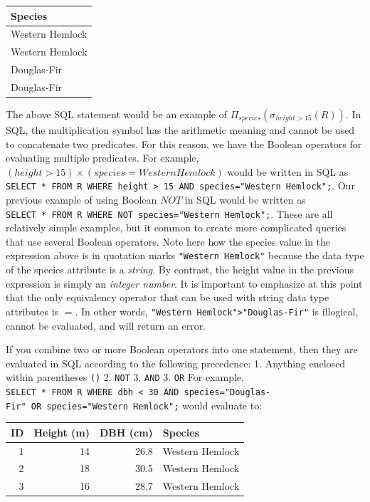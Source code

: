 \documentclass[
]{book}
\begin{document}
\begin{tabular}{l}
\toprule
Species\\
\midrule
Western Hemlock\\
Western Hemlock\\
Douglas-Fir\\
Douglas-Fir\\
\bottomrule
\end{tabular}

The above SQL statement would be an example of \(Π_{species}(σ_{height>15}(R))\). In SQL, the multiplication symbol has the arithmetic meaning and cannot be used to concatenate two predicates. For this reason, we have the Boolean operators for evaluating multiple predicates. For example, \((height>15)×(species=WesternHemlock)\) would be written in SQL as \texttt{SELECT\ *\ FROM\ R\ WHERE\ height\ \textgreater{}\ 15\ AND\ species="Western\ Hemlock";}. Our previous example of using Boolean \(NOT\) in SQL would be written as \texttt{SELECT\ *\ FROM\ R\ WHERE\ NOT\ species="Western\ Hemlock";}. These are all relatively simple examples, but it common to create more complicated queries that use several Boolean operators. Note here how the species value in the expression above is in quotation marks \texttt{"Western\ Hemlock"} because the data type of the species attribute is a \emph{string}. By contrast, the height value in the previous expression is simply an \emph{integer number}. It is important to emphasize at this point that the only equivalency operator that can be used with string data type attributes is \(=\). In other words, \texttt{"Western\ Hemlock"\textgreater{}"Douglas-Fir"} is illogical, cannot be evaluated, and will return an error.

If you combine two or more Boolean operators into one statement, then they are evaluated in SQL according to the following precedence:
1. Anything enclosed within parentheses \texttt{()}
2. \texttt{NOT}
3. \texttt{AND}
3. \texttt{OR}
For example, \texttt{SELECT\ *\ FROM\ R\ WHERE\ dbh\ \textless{}\ 30\ AND\ species="Douglas-Fir"\ OR\ species="Western\ Hemlock";} would evaluate to:

\begin{tabular}{rrrl}
\toprule
ID & Height (m) & DBH (cm) & Species\\
\midrule
1 & 14 & 26.8 & Western Hemlock\\
2 & 18 & 30.5 & Western Hemlock\\
3 & 16 & 28.7 & Western Hemlock\\
\bottomrule
\end{tabular}
\end{document}
